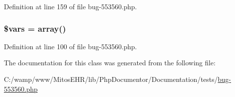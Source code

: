 \-Definition at line 159 of file bug-\/553560.\-php.

\hypertarget{classi_new_render_a09f2c833c130b4443725fb576d9d5269}{
\subsubsection[{\$vars}]{\setlength{\rightskip}{0pt plus 5cm}\$vars = array()}}\label{classi_new_render_a09f2c833c130b4443725fb576d9d5269}


\-Definition at line 100 of file bug-\/553560.\-php.



\-The documentation for this class was generated from the following file\-:\begin{DoxyCompactItemize}
\item 
\-C\-:/wamp/www/\-Mitos\-E\-H\-R/lib/\-Php\-Documentor/\-Documentation/tests/\hyperlink{bug-553560_8php}{bug-\/553560.\-php}\end{DoxyCompactItemize}

